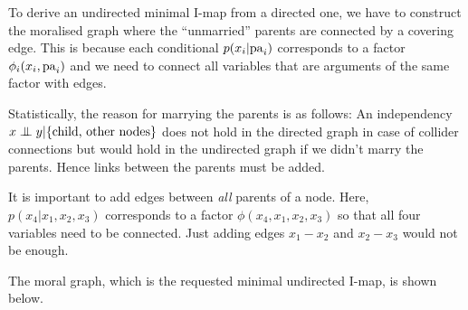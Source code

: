   \begin{solution}

    To derive an undirected minimal I-map from a directed one, we have
    to construct the moralised graph where the ``unmarried'' parents
    are connected by a covering edge. This is because each conditional
    $p(x_i | \mathrm{pa}_i)$ corresponds to a factor $\phi_i(x_i,\mathrm{pa}_i)$ and
    we need to connect all variables that are arguments of the same factor with edges.

    Statistically, the reason for marrying the parents is as follows:
    An independency $x \mathrel{\perp\mspace{-10mu}\perp} y | \{\text{child, other nodes}\}$
    does not hold in the directed graph in case of collider connections
    but would hold in the undirected graph if we didn't marry the
    parents. Hence links between the parents must be added.

    It is important to add edges between \emph{all} parents of a
    node. Here, $p(x_4 | x_1, x_2, x_3)$ corresponds to a factor
    $\phi(x_4, x_1, x_2, x_3)$ so that all four variables need to be
    connected. Just adding edges $x_1 - x_2$ and $x_2 - x_3$ would not be enough.

    The moral graph, which is the requested minimal undirected I-map,
    is shown below.

     \begin{center}
     \end{center}
     
  \end{solution}


